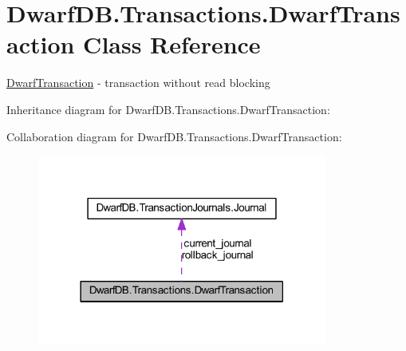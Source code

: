 \hypertarget{class_dwarf_d_b_1_1_transactions_1_1_dwarf_transaction}{\section{Dwarf\+D\+B.\+Transactions.\+Dwarf\+Transaction Class Reference}
\label{class_dwarf_d_b_1_1_transactions_1_1_dwarf_transaction}
}


\hyperlink{class_dwarf_d_b_1_1_transactions_1_1_dwarf_transaction}{Dwarf\+Transaction} -\/ transaction without read blocking  




Inheritance diagram for Dwarf\+D\+B.\+Transactions.\+Dwarf\+Transaction\+:


Collaboration diagram for Dwarf\+D\+B.\+Transactions.\+Dwarf\+Transaction\+:\nopagebreak
\begin{figure}[H]
\begin{center}
\leavevmode
\includegraphics[width=270pt]{class_dwarf_d_b_1_1_transactions_1_1_dwarf_transaction__coll__graph}
\end{center}
\end{figure}

